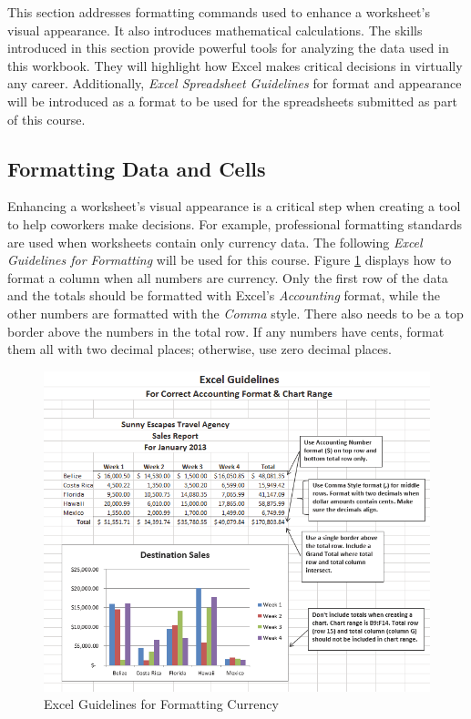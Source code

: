 This section addresses formatting commands used to enhance a worksheet's visual appearance. It also introduces mathematical calculations. The skills introduced in this section provide powerful tools for analyzing the data used in this workbook. They will highlight how Excel makes critical decisions in virtually any career. Additionally, \textit{Excel Spreadsheet Guidelines} for format and appearance will be introduced as a format to be used for the spreadsheets submitted as part of this course.

\subsection{Formatting Data and Cells}

Enhancing a worksheet's visual appearance is a critical step when creating a tool to help coworkers make decisions. For example, professional formatting standards are used when worksheets contain only currency data. The following \textit{Excel Guidelines for Formatting} will be used for this course. Figure \ref{01:fig32} displays how to format a column when all numbers are currency. Only the first row of the data and the totals should be formatted with Excel's \textit{Accounting} format, while the other numbers are formatted with the \textit{Comma} style. There also needs to be a top border above the numbers in the total row. If any numbers have cents, format them all with two decimal places; otherwise, use zero decimal places.

\begin{figure}[H]
	\centering
	\includegraphics[width=\maxwidth{.95\linewidth}]{gfx/ch01_fig32}
	\caption{Excel Guidelines for Formatting Currency}
	\label{01:fig32}
\end{figure}

